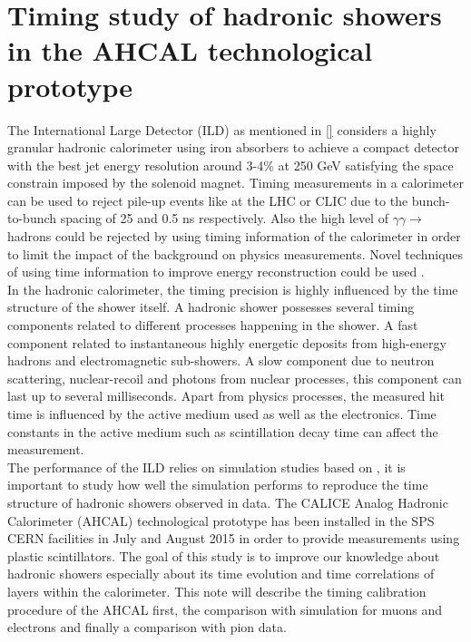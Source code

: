 \chapter{Timing study of hadronic showers in the AHCAL technological prototype}
\label{chap:TimingAHCAL}

The International Large Detector (ILD) as mentioned in \ref{} considers a highly granular hadronic calorimeter using iron absorbers to achieve a compact detector with the best jet energy resolution around 3-4\% at 250 GeV satisfying the space constrain imposed by the solenoid magnet. Timing measurements in a calorimeter can be used to reject pile-up events like at the LHC or CLIC due to the bunch-to-bunch spacing of 25 and 0.5 ns respectively. Also the high level of $\gamma\gamma \rightarrow$ hadrons could be rejected by using timing information of the calorimeter in order to limit the impact of the background on physics measurements. Novel techniques of using time information to improve energy reconstruction could be used \cite{Benaglia2016}.\\

In the hadronic calorimeter, the timing precision is highly influenced by the time structure of the shower itself. A hadronic shower possesses several timing components related to different processes happening in the shower. A fast component related to instantaneous highly energetic deposits from high-energy hadrons and electromagnetic sub-showers. A slow component due to neutron scattering, nuclear-recoil and photons from nuclear processes, this component can last up to several milliseconds. Apart from physics processes, the measured hit time is influenced by the active medium used as well as the electronics. Time constants in the active medium such as scintillation decay time can affect the measurement.\\

The performance of the ILD relies on simulation studies based on \geant, it is important to study how well the simulation performs to reproduce the time structure of hadronic showers observed in data. The CALICE Analog Hadronic Calorimeter (AHCAL) technological prototype has been installed in the SPS CERN facilities in July and August 2015 in order to provide measurements using plastic scintillators. The goal of this study is to improve our knowledge about hadronic showers especially about its time evolution and time correlations of layers within the calorimeter. This note will describe the timing calibration procedure of the AHCAL first, the comparison with simulation for muons and electrons and finally a comparison with pion data.

